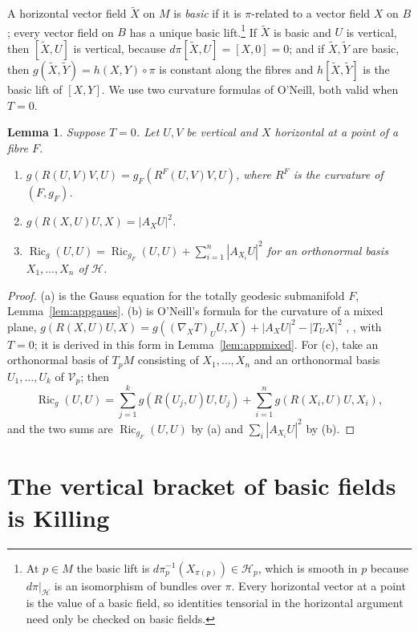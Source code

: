 \documentclass[11pt,reqno]{amsart}
\theoremstyle{plain}
\newtheorem{lemma}[theorem]{Lemma}
\theoremstyle{definition}
\newcommand{\Ric}{\operatorname{Ric}}
\newcommand{\hor}{\mathcal{H}}
\newcommand{\ver}{\mathcal{V}}
\newcommand{\bas}[1]{\widetilde{#1}}
\begin{document}
A horizontal vector field $\bas X$ on $M$ is \emph{basic} if it is $\pi$-related to a vector field $X$ on $B$; every vector field on $B$ has a unique basic lift.\footnote{At $p\in M$ the basic lift is $d\pi_p^{-1}(X_{\pi(p)})\in\hor_p$, which is smooth in $p$ because $d\pi|_{\hor}$ is an isomorphism of bundles over $\pi$. Every horizontal vector at a point is the value of a basic field, so identities tensorial in the horizontal argument need only be checked on basic fields.} If $\bas X$ is basic and $U$ is vertical, then $[\bas X,U]$ is vertical, because $d\pi[\bas X,U]=[X,0]=0$; and if $\bas X,\bas Y$ are basic, then $g(\bas X,\bas Y)=h(X,Y)\circ\pi$ is constant along the fibres and $h[\bas X,\bas Y]$ is the basic lift of $[X,Y]$. We use two curvature formulas of O'Neill, both valid when $T=0$.

\begin{lemma}\label{lem:oneill}
Suppose $T=0$. Let $U,V$ be vertical and $X$ horizontal at a point of a fibre $F$.
\begin{enumerate}
\item[(a)] $g(R(U,V)V,U)=g_F(R^{F}(U,V)V,U)$, where $R^F$ is the curvature of $(F,g_F)$.
\item[(b)] $g(R(X,U)U,X)=|A_XU|^2$.
\item[(c)] $\Ric_g(U,U)=\Ric_{g_F}(U,U)+\sum_{i=1}^{n}|A_{X_i}U|^2$ for an orthonormal basis $X_1,\dots,X_n$ of $\hor$.
\end{enumerate}
\end{lemma}

\begin{proof}
(a) is the Gauss equation for the totally geodesic submanifold $F$, Lemma~\ref{lem:appgauss}. (b) is O'Neill's formula for the curvature of a mixed plane, $g(R(X,U)U,X)=g((\nabla_XT)_UU,X)+|A_XU|^2-|T_UX|^2$ \cite[Theorem 2 and Corollary 1]{ONeill1966}, \cite[9.28]{Besse1987}, with $T=0$; it is derived in this form in Lemma~\ref{lem:appmixed}. For (c), take an orthonormal basis of $T_pM$ consisting of $X_1,\dots,X_n$ and an orthonormal basis $U_1,\dots,U_k$ of $\ver_p$; then
\[
\Ric_g(U,U)=\sum_{j=1}^{k}g(R(U_j,U)U,U_j)+\sum_{i=1}^{n} g(R(X_i,U)U,X_i),
\]
and the two sums are $\Ric_{g_F}(U,U)$ by (a) and $\sum_i|A_{X_i}U|^2$ by (b).
\end{proof}

\section{The vertical bracket of basic fields is Killing}\label{sec:killing}
\end{document}
